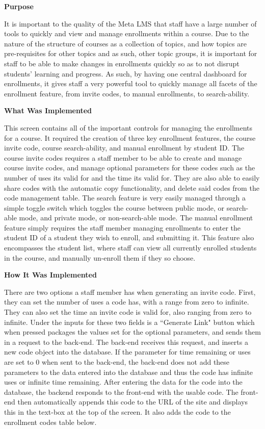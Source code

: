 \textbf{Purpose}

It is important to the quality of the Meta LMS that staff have a large number of tools to quickly and view and manage enrollments within a course. Due to the nature of the structure of courses as a collection of topics, and how topics are pre-requisites for other topics and as such, other topic groups, it is important for staff to be able to make changes in enrollments quickly so as to not disrupt students' learning and progress. As such, by having one central dashboard for enrollments, it gives staff a very powerful tool to quickly manage all facets of the enrollment feature, from invite codes, to manual enrollments, to search-ability.

\textbf{What Was Implemented}

This screen contains all of the important controls for managing the enrollments for a course. It required the creation of three key enrollment features, the course invite code, course search-ability, and manual enrollment by student ID. The course invite codes requires a staff member to be able to create and manage course invite codes, and manage optional parameters for these codes such as the number of uses its valid for and the time its valid for. They are also able to easily share codes with the automatic copy functionality, and delete said codes from the code management table. The search feature is very easily managed through a simple toggle switch which toggles the course between public mode, or search-able mode, and private mode, or non-search-able mode. The manual enrollment feature simply requires the staff member managing enrollments to enter the student ID of a student they wish to enroll, and submitting it. This feature also encompasses the student list, where staff can view all currently enrolled students in the course, and manually un-enroll them if they so choose.

\textbf{How It Was Implemented}

There are two options a staff member has when generating an invite code. First, they can set the number of uses a code has, with a range from zero to infinite. They can also set the time an invite code is valid for, also ranging from zero to infinite. Under the inputs for these two fields is a ``Generate Link" button which when pressed packages the values set for the optional parameters, and sends them in a request to the back-end. The back-end receives this request, and inserts a new code object into the database. If the parameter for time remaining or uses are set to 0 when sent to the back-end, the back-end does not add these parameters to the data entered into the database and thus the code has infinite uses or infinite time remaining. After entering the data for the code into the database, the backend responds to the front-end with the usable code. The front-end then automatically appends this code to the URL of the site and displays this in the text-box at the top of the screen. It also adds the code to the enrollment codes table below.

